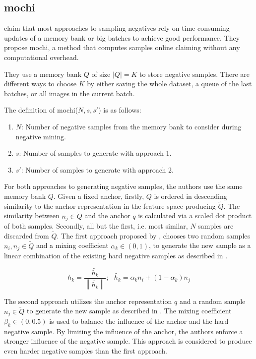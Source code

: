 \subsection{\acl{mochi}}\label{subsec:MoCHi}

\citet{mochi_2020} claim that most approaches to sampling negatives rely on 
time-consuming updates of a memory bank or big batches to achieve good performance.
They propose \ac{mochi}, a method that computes samples online claiming without any computational overhead.

They use a memory bank $Q$ of size $| Q | = K$ to store negative samples.
There are different ways to choose $K$ by either saving the whole dataset, a queue of the last batches,
or all images in the current batch.

The definition of \ac{mochi}($N, s, s'$) is as follows:
\begin{enumerate}
    \item $N$: Number of negative samples from the memory bank to consider during negative mining.
    \item $s$: Number of samples to generate with approach 1.
    \item $s'$: Number of samples to generate with approach 2.
\end{enumerate}
For both approaches to generating negative samples, the authors use the same memory bank $Q$.
Given a fixed anchor, firstly, $Q$ is ordered in descending similarity to the anchor representation    
in the feature space producing $\tilde{Q}$.
The similarity between $n_j \in \tilde{Q}$ and the anchor $q$ is calculated via 
a scaled dot product of both samples.
Secondly, all but the first, i.e. most similar, $N$ samples are discarded from $\tilde{Q}$.
The first approach proposed by \citeauthor{mochi_2020}, chooses two random samples $n_i, n_j \in \tilde{Q}$ 
and a mixing coefficient $\alpha_k \in (0,1)$, 
to generate the new sample as a linear combination of the existing hard negative samples 
as described in .

\begin{equation}
    h_k = \frac{\tilde{h_k}}{\left\| \tilde{h_k}  \right\|}; \text{  } \tilde{h_k} = \alpha_k n_i + (1-\alpha_k)n_j
    \label{eq:mochi_appr1}
\end{equation}

The second approach utilizes the anchor representation $q$ 
and a random sample $n_j \in \tilde{Q}$ to generate the new sample as described in .
The mixing coefficient $\beta_k \in (0,0.5)$ is used to balance the influence of the anchor 
and the hard negative sample.
By limiting the influence of the anchor, the authors enforce a stronger influence of the negative sample.
This approach is considered to produce even harder negative samples than the first approach.

